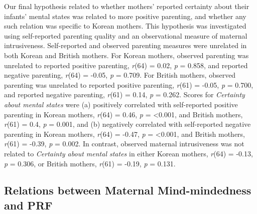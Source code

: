 \documentclass[
]{article}
\begin{document}
Our final hypothesis related to whether mothers' reported certainty about their infants' mental states was related to more positive parenting, and whether any such relation was specific to Korean mothers. This hypothesis was investigated using self-reported parenting quality and an observational measure of maternal intrusiveness. Self-reported and observed parenting measures were unrelated in both Korean and British mothers.
For Korean mothers, observed parenting was unrelated to reported positive parenting, \emph{r}(64) = 0.02, \emph{p} = 0.858, and reported negative parenting,
\emph{r}(64) = -0.05, \emph{p} = 0.709.
For British mothers, observed parenting was unrelated to reported positive parenting, \emph{r}(61) = -0.05, \emph{p} = 0.700, and reported negative parenting,
\emph{r}(61) = 0.14, \emph{p} = 0.262.
Scores for \emph{Certainty about mental states} were (a) positively correlated with self-reported positive parenting in Korean mothers, \emph{r}(64) = 0.46, \emph{p} = \textless0.001, and British mothers, \emph{r}(61) = 0.4, \emph{p} = 0.001,
and (b) negatively correlated with self-reported negative parenting in Korean mothers, \emph{r}(64) = -0.47, \emph{p} = \textless0.001, and British mothers, \emph{r}(61) = -0.39, \emph{p} = 0.002.
In contrast, observed maternal intrusiveness was not related to \emph{Certainty about mental states} in either Korean mothers, \emph{r}(64) = -0.13, \emph{p} = 0.306, or British mothers, \emph{r}(61) = -0.19, \emph{p} = 0.131.

\hypertarget{relations-between-maternal-mind-mindedness-and-prf}{%
\subsection*{Relations between Maternal Mind-mindedness and PRF}\label{relations-between-maternal-mind-mindedness-and-prf}}
\end{document}
